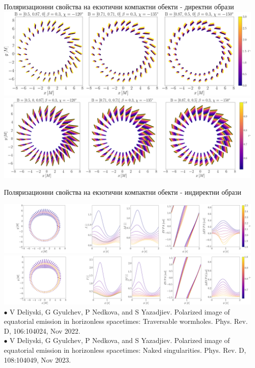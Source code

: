 \documentclass[hyperref={colorlinks,citecolor=blue,linkcolor=blue,urlcolor=blue}]{beamer}
\begin{document}
	\begin{frame}{Поляризационни свойства на екзотични компактни обекти - директни образи}
		\centering
		\includegraphics[scale = 0.14]{Section_7_Polarized_Emission/WH_alpha_Eq_Field.png}\\
		\includegraphics[scale = 0.12]{Section_7_Polarized_Emission/JNW_alpha_Eq_Field.png}
	\end{frame}
	
	\begin{frame}{Поляризационни свойства на екзотични компактни обекти - индиректни образи}
		
		\centering
		\includegraphics[scale = 0.12]{Section_7_Polarized_Emission/WH_delta_fig_B_0.5_0.87_0_20_deg_r6_n1.png}
		\includegraphics[scale = 0.12]{Section_7_Polarized_Emission/JNW_delta_fig_B_0.5_0.87_0_20_deg_r6_n1.png}\\
		
			
		\tiny  $\bullet$ V Deliyski, G Gyulchev, P Nedkova, and S Yazadjiev.
		Polarized image of equatorial emission in horizonless spacetimes: Traversable
		wormholes. Phys. Rev. D, 106:104024, Nov 2022.\\
		$\bullet$ V Deliyski, G Gyulchev, P Nedkova, and S Yazadjiev.
		Polarized image of equatorial emission in horizonless spacetimes: Naked
		singularities. Phys. Rev. D, 108:104049, Nov 2023.
		
	\end{frame}
\end{document}

